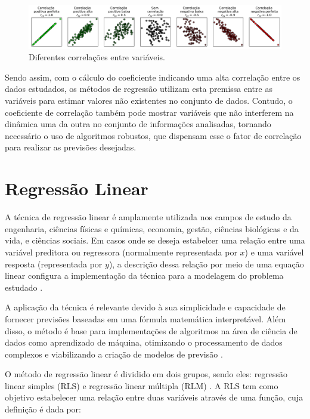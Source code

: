 \begin{figure}[H]
	\caption{\label{fig:correlacoes}Diferentes correlações entre variáveis.}
	\begin{center}
		\includegraphics[scale=0.4]{figuras/correlations.png}
	\end{center}
\end{figure}

Sendo assim, com o cálculo do coeficiente indicando uma alta correlação entre os dados estudados, os métodos de regressão utilizam esta premissa entre as variáveis para estimar valores não existentes no conjunto de dados. Contudo, o coeficiente de correlação também pode mostrar variáveis que não interferem na dinâmica uma da outra no conjunto de informações analisadas, tornando necessário o uso de algoritmos robustos, que dispensam esse o fator de correlação para realizar as previsões desejadas. 

\section{Regressão Linear}
\label{sec:regressao-linear}

A técnica de regressão linear é amplamente utilizada nos campos de estudo da engenharia, ciências físicas e químicas, economia, gestão, ciências biológicas e da vida, e ciências sociais. Em casos onde se deseja estabelcer uma relação entre uma variável preditora ou regressora (normalmente representada por $x$) e uma variável resposta (representada por $y$), a descrição dessa relação por meio de uma equação linear configura a implementação da técnica para a modelagem do problema estudado \cite{montgomery2012}.  

A aplicação da técnica é relevante devido à sua simplicidade e capacidade de fornecer previsões baseadas em uma fórmula matemática interpretável. Além disso, o método é base para implementações de algoritmos na área de ciência de dados como aprendizado de máquina, otimizando o processamento de dados complexos e viabilizando a criação de modelos de previsão \cite{aws2024}.

O método de regressão linear é dividido em dois grupos, sendo eles: regressão linear simples (RLS) e regressão linear múltipla (RLM) \cite{montgomery2012}. A RLS tem como objetivo estabelecer uma relação entre duas variáveis através de uma função, cuja definição é dada por:

